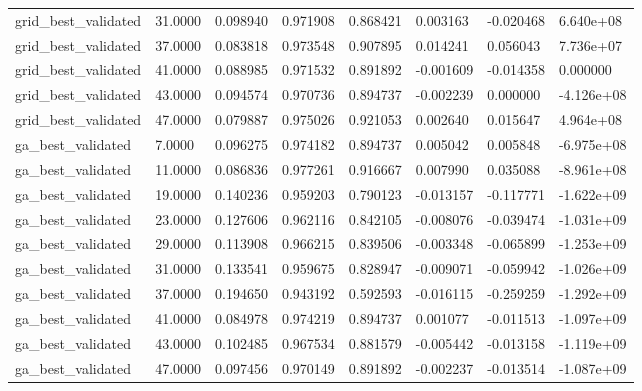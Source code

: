 \documentclass[11pt]{report}
\begin{document}
\begin{longtable}{llllllll}
grid\_best\_validated & 31.0000 & 0.098940 & 0.971908 & 0.868421 & 0.003163 & -0.020468 & 6.640e+08 \\
grid\_best\_validated & 37.0000 & 0.083818 & 0.973548 & 0.907895 & 0.014241 & 0.056043 & 7.736e+07 \\
grid\_best\_validated & 41.0000 & 0.088985 & 0.971532 & 0.891892 & -0.001609 & -0.014358 & 0.000000 \\
grid\_best\_validated & 43.0000 & 0.094574 & 0.970736 & 0.894737 & -0.002239 & 0.000000 & -4.126e+08 \\
grid\_best\_validated & 47.0000 & 0.079887 & 0.975026 & 0.921053 & 0.002640 & 0.015647 & 4.964e+08 \\
ga\_best\_validated & 7.0000 & 0.096275 & 0.974182 & 0.894737 & 0.005042 & 0.005848 & -6.975e+08 \\
ga\_best\_validated & 11.0000 & 0.086836 & 0.977261 & 0.916667 & 0.007990 & 0.035088 & -8.961e+08 \\
ga\_best\_validated & 19.0000 & 0.140236 & 0.959203 & 0.790123 & -0.013157 & -0.117771 & -1.622e+09 \\
ga\_best\_validated & 23.0000 & 0.127606 & 0.962116 & 0.842105 & -0.008076 & -0.039474 & -1.031e+09 \\
ga\_best\_validated & 29.0000 & 0.113908 & 0.966215 & 0.839506 & -0.003348 & -0.065899 & -1.253e+09 \\
ga\_best\_validated & 31.0000 & 0.133541 & 0.959675 & 0.828947 & -0.009071 & -0.059942 & -1.026e+09 \\
ga\_best\_validated & 37.0000 & 0.194650 & 0.943192 & 0.592593 & -0.016115 & -0.259259 & -1.292e+09 \\
ga\_best\_validated & 41.0000 & 0.084978 & 0.974219 & 0.894737 & 0.001077 & -0.011513 & -1.097e+09 \\
ga\_best\_validated & 43.0000 & 0.102485 & 0.967534 & 0.881579 & -0.005442 & -0.013158 & -1.119e+09 \\
ga\_best\_validated & 47.0000 & 0.097456 & 0.970149 & 0.891892 & -0.002237 & -0.013514 & -1.087e+09 \\
\bottomrule
\end{longtable}
\end{document}

